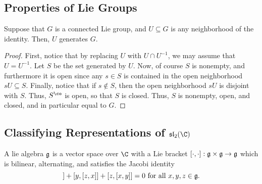 \documentclass[12pt]{article}
\begin{document}
\subsection{Properties of Lie Groups}

\begin{proposition}\label{prop:Generation_by_Neighborhoods}
    Suppose that $G$ is a connected Lie group, and $U \subseteq G$ is any neighborhood of the identity. Then, $U$ generates $G$. 
\end{proposition}
\begin{proof}
    First, notice that by replacing $U$ with $U \cap U^{-1}$, we may assume that $U = U^{-1}$. Let $S$ be the set generated by $U$. Now, of course $S$ is nonempty, and furthermore it is open since any $s \in S$ is contained in the open neighborhood $sU \subseteq S$. Finally, notice that if $s \not\in S$, then the open neighborhood $sU$ is disjoint with $S$. Thus, $S^{\co}$ is open, so that $S$ is closed. Thus, $S$ is nonempty, open, and closed, and in particular equal to $G$. 
\end{proof}

\subsection{Classifying Representations of $\frak{sl}_2(\C)$}

\begin{definition}\label{def:Lie_Algebra}
    A lie algebra $\frak{g}$ is a vector space over $\C$ with a Lie bracket $[\cdot, \cdot]: \frak{g} \times \frak{g} \rightarrow \frak{g}$ which is bilinear, alternating, and satisfies the Jacobi identity
    \begin{equation*}
        [x, [y,z]] + [y, [z,x]] + [z, [x, y] ] = 0 \text{ for all } x,y,z \in \frak{g}.
    \end{equation*}
\end{definition}
\end{document}
